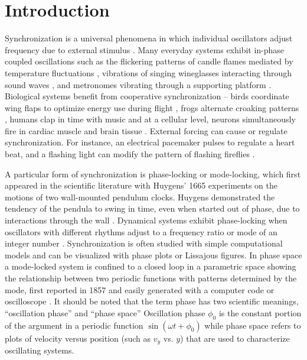 \documentclass[twocolumn,preprintnumbers,amsmath,amssymb,aps,prx]{revtex4}
\begin{document}
\section{Introduction} %
%
Synchronization is a universal phenomena
in which individual oscillators adjust frequency due
to external stimulus \cite{Pikovsky2003}.
Many everyday systems
exhibit in-phase coupled oscillations %
such as the
flickering patterns of
candle flames mediated by temperature fluctuations \cite{Okamoto2016},
vibrations of singing wineglasses interacting 
through sound waves \cite{Arane2009}, 
and metronomes vibrating through a supporting platform \cite{Jia2015}.
Biological systems benefit from cooperative
synchronization -- %
birds coordinate wing flaps
to optimize energy use during flight \cite{Portugal2014},
frogs alternate croaking patterns \cite{Aihara2014},
humans clap in time with music \cite{Tranchant2016}
and 
at a cellular level, 
neurons simultaneously fire in cardiac muscle \cite{MartinHall1999}
and brain tissue \cite{Singer1999}.
External forcing can cause or regulate 
synchronization. %
For instance,
an electrical pacemaker %
pulses to regulate a heart beat,
and 
a flashing light can modify the
pattern of flashing fireflies .%

A particular form of 
synchronization is phase-locking or mode-locking,
which first appeared in the scientific literature
with 
Huygens' 1665 experiments on
the 
motions of two wall-mounted pendulum clocks.
Huygens demonstrated the tendency of
the pendula 
to swing in time, 
even when started out of phase,
due to interactions through the wall \cite{Bennett2002}.
Dynamical systems %
exhibit phase-locking 
when oscillators with different rhythms adjust %
to a frequency ratio or mode 
of an integer number \cite{Bak1986}.
Synchronization 
is often studied with simple computational models
and can be visualized 
with phase
plots or Lissajous figures.
In phase space 
a mode-locked system is confined to 
a closed loop in a 
parametric space showing the relationship between two periodic functions
with patterns determined by the mode, %
first reported in 1857 \cite{Lissajous1857}
and easily generated with a computer code 
or oscilloscope \cite{Tong1997}. 
It should be noted that the term phase
has two scientific meanings, 
``oscillation phase'' and ``phase space''
Oscillation phase $\phi_0$ is the constant portion of the argument in a periodic function
  $\sin{(\omega t + \phi_0)}$ while phase space refers
  to plots of velocity versus position (such as $v_y$ vs. $y$)
  that are used to characterize oscillating systems.
 
\end{document}
